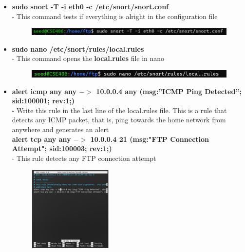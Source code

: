 \documentclass[12pt, A4Paper]{article}
\begin{document}
\begin{enumerate}
\begin{itemize}
        \item \textbf{sudo snort -T -i eth0 -c /etc/snort/snort.conf}\\ 
    - This command tests if everything is alright in the configuration file
        \begin{figure}[h]
            \centering
            \includegraphics{images/test_conf}
        \end{figure}

        \item \textbf{sudo nano /etc/snort/rules/local.rules}\\ 
    - This command opens the \textbf{local.rules} file in nano
        \begin{figure}[h]
            \centering
            \includegraphics{images/sudo_nano_rules}
        \end{figure}

        \item \textbf{alert icmp any any $->$ 10.0.0.4 any (msg:”ICMP Ping Detected”; sid:100001; rev:1;)}\\ 
        - Write this rule in the last line of the local.rules file. This is a rule that detects any ICMP packet, that is, ping towards the home network from anywhere and generates an alert\\

        \textbf{alert tcp any any $->$ 10.0.0.4 21 (msg:"FTP Connection Attempt"; sid:100003; rev:1;)}\\ 
        - This rule detects any FTP connection attempt
        \begin{figure}[h]
            \centering
            \includegraphics[width=0.4\textwidth]{images/add_rules}
        \end{figure}


\end{itemize}
\end{enumerate}
\end{document}
